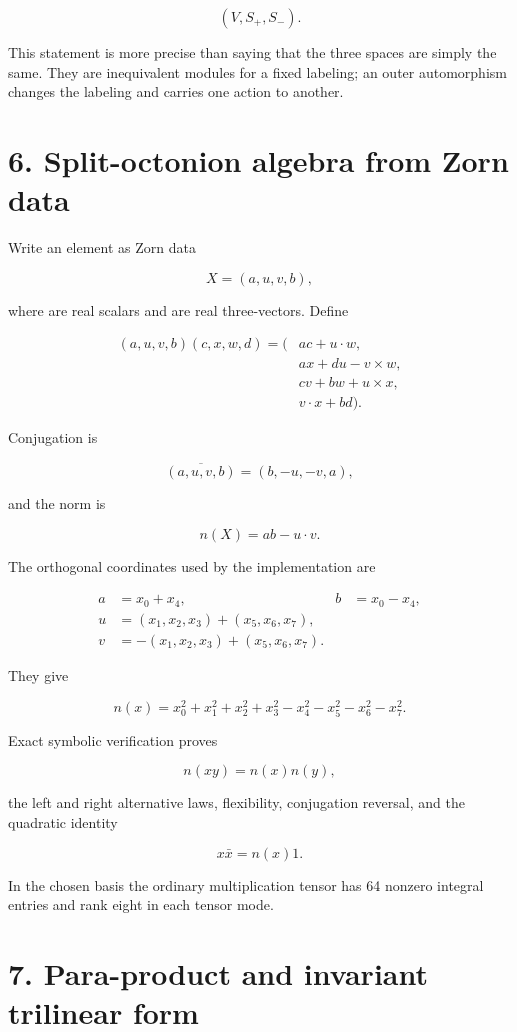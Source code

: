 \documentclass[11pt]{article}
\begin{document}
\[
(V,S_+,S_-).
\]

This statement is more precise than saying that the three spaces are simply the same. They are inequivalent modules for a fixed labeling; an outer automorphism changes the labeling and carries one action to another.

\section{6. Split-octonion algebra from Zorn data}

Write an element as Zorn data

\[
X=(a,u,v,b),
\]

where \texttt{} are real scalars and \texttt{} are real three-vectors. Define

\[
\begin{aligned}
(a,u,v,b)(c,x,w,d)=(&ac+u\cdot w,\\
&ax+du-v\times w,\\
&cv+bw+u\times x,\\
&v\cdot x+bd).
\end{aligned}
\]

Conjugation is

\[
\overline{(a,u,v,b)}=(b,-u,-v,a),
\]

and the norm is

\[
n(X)=ab-u\cdot v.
\]

The orthogonal coordinates used by the implementation are

\[
\begin{aligned}
a&=x_0+x_4,& b&=x_0-x_4,\\
u&=(x_1,x_2,x_3)+(x_5,x_6,x_7),\\
v&=-(x_1,x_2,x_3)+(x_5,x_6,x_7).
\end{aligned}
\]

They give

\[
n(x)=x_0^2+x_1^2+x_2^2+x_3^2
-x_4^2-x_5^2-x_6^2-x_7^2.
\]

Exact symbolic verification proves

\[
n(xy)=n(x)n(y),
\]

the left and right alternative laws, flexibility, conjugation reversal, and the quadratic identity

\[
x\bar x=n(x)1.
\]

In the chosen basis the ordinary multiplication tensor has 64 nonzero integral entries and rank eight in each tensor mode.

\section{7. Para-product and invariant trilinear form}
\end{document}
